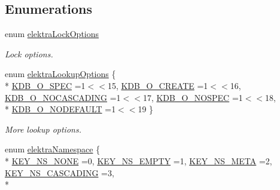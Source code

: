 \subsection*{Enumerations}
\begin{DoxyCompactItemize}
\item 
enum \hyperlink{group__proposal_ga824e384e248ed1e05448294bff7271c0}{elektra\-Lock\-Options} 
\begin{DoxyCompactList}\small\item\em Lock options. \end{DoxyCompactList}\item 
enum \hyperlink{group__proposal_ga93673533c4c8eb1fdfca76b98c5f49b0}{elektra\-Lookup\-Options} \{ \\*
\hyperlink{group__proposal_gga93673533c4c8eb1fdfca76b98c5f49b0a187bc7e52493fb8f1eb5693015478dae}{K\-D\-B\-\_\-\-O\-\_\-\-S\-P\-E\-C} =1$<$$<$15, 
\hyperlink{group__proposal_gga93673533c4c8eb1fdfca76b98c5f49b0a72155bedec545b2e96372ab28169620a}{K\-D\-B\-\_\-\-O\-\_\-\-C\-R\-E\-A\-T\-E} =1$<$$<$16, 
\hyperlink{group__proposal_gga93673533c4c8eb1fdfca76b98c5f49b0abc4c6e04823b6d684f4db8df3b84f326}{K\-D\-B\-\_\-\-O\-\_\-\-N\-O\-C\-A\-S\-C\-A\-D\-I\-N\-G} =1$<$$<$17, 
\hyperlink{group__proposal_gga93673533c4c8eb1fdfca76b98c5f49b0a420d8ea3671ffea4fe8400570cfe5c8d}{K\-D\-B\-\_\-\-O\-\_\-\-N\-O\-S\-P\-E\-C} =1$<$$<$18, 
\\*
\hyperlink{group__proposal_gga93673533c4c8eb1fdfca76b98c5f49b0abdcfd6d28200b5c650615fba430496bb}{K\-D\-B\-\_\-\-O\-\_\-\-N\-O\-D\-E\-F\-A\-U\-L\-T} =1$<$$<$19
 \}
\begin{DoxyCompactList}\small\item\em More lookup options. \end{DoxyCompactList}\item 
enum \hyperlink{group__proposal_gaec3b8d6f430ae49b91bafe8a86310a68}{elektra\-Namespace} \{ \\*
\hyperlink{group__proposal_ggaec3b8d6f430ae49b91bafe8a86310a68a3659698b0a07454ca8055ab693e8efd1}{K\-E\-Y\-\_\-\-N\-S\-\_\-\-N\-O\-N\-E} =0, 
\hyperlink{group__proposal_ggaec3b8d6f430ae49b91bafe8a86310a68a33d6c53529b4e6921d0b1d6565df2f1f}{K\-E\-Y\-\_\-\-N\-S\-\_\-\-E\-M\-P\-T\-Y} =1, 
\hyperlink{group__proposal_ggaec3b8d6f430ae49b91bafe8a86310a68ac5fbf2c3a7ae79fa2d60c48ae3e72688}{K\-E\-Y\-\_\-\-N\-S\-\_\-\-M\-E\-T\-A} =2, 
\hyperlink{group__proposal_ggaec3b8d6f430ae49b91bafe8a86310a68a2c9133e3095dccbcde5ca3bb13987b5d}{K\-E\-Y\-\_\-\-N\-S\-\_\-\-C\-A\-S\-C\-A\-D\-I\-N\-G} =3, 
\\*
$$
\end{DoxyCompactItemize}
